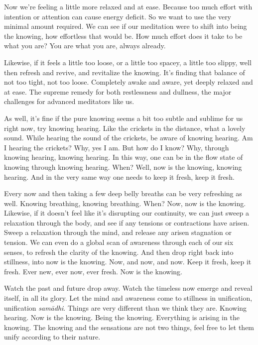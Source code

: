 \documentclass[12pt,openany]{book}
\begin{document}
Now we're feeling a little more relaxed and at ease. Because too much effort with intention or attention can cause energy de\-fi\-cit. So we want to use the very minimal amount required. We can see if our meditation were to shift into being the knowing, how effortless that would be. How much effort does it take to be what you are? You are what you are, always already. 

Likewise, if it feels a little too loose, or a little too spacey, a little too slippy, well then refresh and revive, and revitalize the knowing. It’s finding that balance of not too tight, not too loose. Completely awake and aware, yet deeply relaxed and at ease. The supreme remedy for both restlessness and dullness, the major challenges for advanced meditators like us.

As well, it's fine if the pure knowing seems a bit too subtle and sublime for us right now, try knowing hearing. Like the crickets in the distance, what a lovely sound. While hearing the sound of the crickets, be aware of knowing hearing. Am I hearing the crickets? Why, yes I am. But how do I know? Why, through knowing hearing, knowing hearing. In this way, one can be in the flow state of knowing through knowing hearing. When? Well, now is the knowing, knowing hearing. And in the very same way one needs to keep it fresh, keep it fresh. 

Every now and then taking a few deep belly breaths can be very refreshing as well. Knowing breathing, knowing breathing. When? Now, now is the knowing. Likewise, if it doesn’t feel like it’s disrupting our continuity, we can just sweep a relaxation \linebreak through the body, and see if any tensions or contractions have arisen. Sweep a relaxation through the mind, and release any ari\-sen stagnation or tension. We can even do a global scan of awareness through each of our six senses, to refresh the clarity of the knowing. And then drop right back into stillness, into now is the knowing. Now, and now, and now. Keep it fresh, keep it fresh. Ever new, ever now, ever fresh. Now is the knowing.

Watch the past and future drop away. Watch the timeless now emerge and reveal itself, in all its glory. Let the mind and awareness come to stillness in unification, unification \textit{samādhi}. Things are very different than we think they are. Knowing hearing. Now is the knowing. Being the knowing. Everything is arising in the knowing. The knowing and the sensations are not two things, feel free to let them unify according to their nature.
\end{document}
